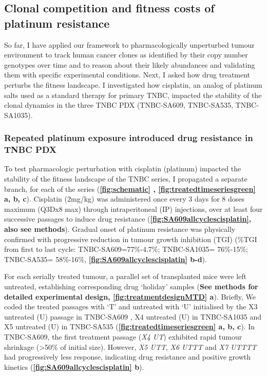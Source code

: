 \subsection{Clonal competition and fitness costs of platinum resistance}
So far, I have applied our framework to pharmacologically unperturbed tumour environment to track human cancer clones as identified by their copy number genotypes over time and to reason about their likely abundances and validating them with specific experimental conditions. Next, I asked how drug treatment perturbs the fitness landscape. I investigated how cisplatin, an analog of platinum salts used as a standard therapy for primary TNBC, impacted the stability of the clonal dynamics in the three TNBC PDX (TNBC-SA609, TNBC-SA535, TNBC-SA1035).


\subsubsection{Repeated platinum exposure introduced drug resistance in TNBC PDX} 
 To test pharmacologic perturbation with cisplatin (platinum) impacted the stability of the fitness landscape of the TNBC series, I propagated a separate branch, for each of the series (\textbf{\autoref{fig:schematic} , \autoref{fig:treatedtimeseriesgreen} a, b, c}). Cisplatin (2mg/kg) was administered once every 3 days for 8 doses maximum (Q3Dx8 max) through intraperitoneal (IP) injections, over at least four successive passages to induce drug resistance  (\textbf{\autoref{fig:SA609allcyclescisplatin}, also see methods}). Gradual onset of platinum resistance was physically confirmed with progressive reduction in tumour growth inhibition (TGI) \cite{hather2014growth} (\%TGI from first to last cycle: TNBC-SA609=77\%-4.7\%; TNBC-SA1035= 76\%-15\%; TNBC-SA535= 58\%-16\%, \textbf{\autoref{fig:SA609allcyclescisplatin} b-d}).
 
 For each serially treated tumour, a parallel set of transplanted mice were left untreated, establishing corresponding drug `holiday' samples (\textbf{See methods for detailed experimental design, \textbf{\autoref{fig:treatmentdesignMTD} a}}). Briefly, We coded the treated passages with `T' and untreated with `U' initialised by the X3 untreated (U) passage in TNBC-SA609 , X4 untreated (U) in TNBC-SA1035 and X5 untreated (U) in  TNBC-SA535 (\textbf{\autoref{fig:treatedtimeseriesgreen} a, b, c}). In TNBC-SA609, the first treatment passage (\textit{X4 UT}) exhibited rapid tumour shrinkage (>50\% of initial size). However, \textit{X5 UTT}, \textit{X6 UTTT} and \textit{X7 UTTTT} had progressively less response, indicating drug resistance and positive growth kinetics (\textbf{\autoref{fig:SA609allcyclescisplatin} b}).


